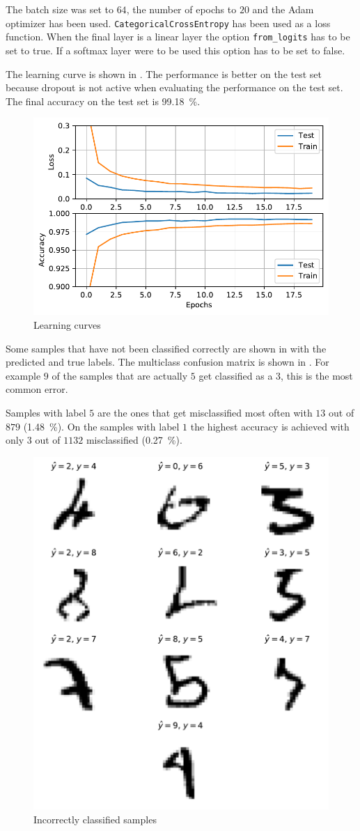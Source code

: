 \documentclass[12pt,a4paper]{scrartcl}
\begin{document}
	The batch size was set to $64$, the number of epochs to $20$ and the Adam optimizer has been used. \texttt{CategoricalCrossEntropy} has been used as a loss function. When the final layer is a linear layer the option \texttt{from\_logits} has to be set to true. If a softmax layer were to be used this option has to be set to false. 
	
	The learning curve is shown in . The performance is better on the test set because dropout is not active when evaluating the performance on the test set. The final accuracy on the test set is \SI{99.18}{\percent}.
	
	\begin{figure}[H]
		\centering
		\includegraphics[width=0.75\linewidth]{figs/ex4_2_learning_curve}
		\caption{Learning curves}
		\label{fig:ex4_2_learning_curve}
	\end{figure}
	
	Some samples that have not been classified correctly are shown in  with the predicted and true labels. The multiclass confusion matrix is shown in .
	For example $9$ of the samples that are actually $5$ get classified as a $3$, this is the most common error.
	
	Samples with label $5$ are the ones that get misclassified most often with $13$ out of $879$ (\SI{1.48}{\percent}).
	On the samples with label $1$ the highest accuracy is achieved with only $3$ out of $1132$ misclassified (\SI{0.27}{\percent}).
	
	
	\begin{figure}[H]
		\centering
		\includegraphics[width=0.5\linewidth]{figs/ex4_2_incorrect}
		\caption{Incorrectly classified samples}
		\label{fig:ex4_2_incorrect}
	\end{figure}
	
\end{document}
